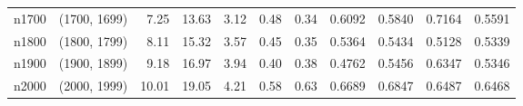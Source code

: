 \begin{tabular}{llrrrrrrrrr}
   n1700 & (1700, 1699) &  7.25 & 13.63 & 3.12 &  0.48 &   0.34 &   0.6092 &   0.5840 &     0.7164 &      0.5591 \\
   n1800 & (1800, 1799) &  8.11 & 15.32 & 3.57 &  0.45 &   0.35 &   0.5364 &   0.5434 &     0.5128 &      0.5339 \\
   n1900 & (1900, 1899) &  9.18 & 16.97 & 3.94 &  0.40 &   0.38 &   0.4762 &   0.5456 &     0.6347 &      0.5346 \\
   n2000 & (2000, 1999) & 10.01 & 19.05 & 4.21 &  0.58 &   0.63 &   0.6689 &   0.6847 &     0.6487 &      0.6468 \\
\bottomrule
\end{tabular}
